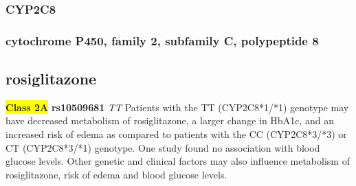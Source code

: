 \documentclass{book}
\begin{document}
\subsubsection{ CYP2C8 }
\subsubsection{ cytochrome P450, family 2, subfamily C, polypeptide 8 }

\subsection{ rosiglitazone }


\begin{center}


\textbf{\colorbox{yellow} {Class 2A}} \textbf{ rs10509681 } \textit{ TT }
Patients with the TT (CYP2C8*1/*1) genotype may have decreased metabolism of rosiglitazone, a larger change in HbA1c, and an increased risk of edema as compared to patients with the CC (CYP2C8*3/*3) or CT (CYP2C8*3/*1) genotype. One study found no association with blood glucose levels. Other genetic and clinical factors may also influence metabolism of rosiglitazone, risk of edema and blood glucose levels.


\end{center}
\end{document}
